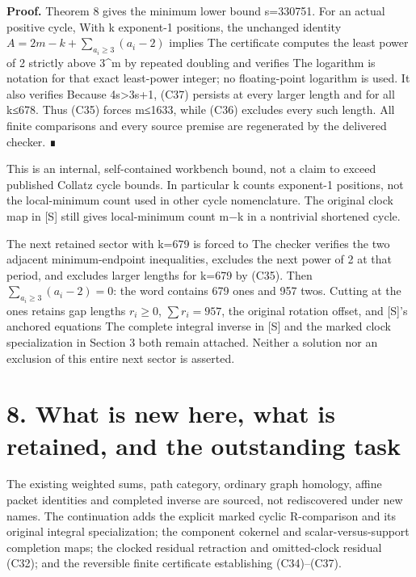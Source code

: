 \textbf{Proof.} Theorem 8 gives the minimum lower bound s=330751. For an
actual positive cycle,
 With k
exponent-1 positions, the unchanged identity
\(A=2m-k+\sum_{a_i\ge3}(a_i-2)\) implies
 The certificate computes the
least power of 2 strictly above 3\^{}m by repeated doubling and verifies
 The logarithm is notation for that exact
least-power integer; no floating-point logarithm is used. It also
verifies  Because
4s\textgreater3s+1, (C37) persists at every larger length and for all
k≤678. Thus (C35) forces m≤1633, while (C36) excludes every such length.
All finite comparisons and every source premise are regenerated by the
delivered checker. ∎

This is an internal, self-contained workbench bound, not a claim to
exceed published Collatz cycle bounds. In particular k counts exponent-1
positions, not the local-minimum count used in other cycle nomenclature.
The original clock map in {[}S{]} still gives local-minimum count m−k in
a nontrivial shortened cycle.

The next retained sector with k=679 is forced to
 The checker verifies the two adjacent
minimum-endpoint inequalities, excludes the next power of 2 at that
period, and excludes larger lengths for k=679 by (C35). Then
\(\sum_{a_i\ge3}(a_i-2)=0\): the word contains 679 ones and 957 twos.
Cutting at the ones retains gap lengths \(r_i\ge0\), \(\sum r_i=957\),
the original rotation offset, and {[}S{]}'s anchored equations
The complete integral inverse in {[}S{]} and the marked clock
specialization in Section 3 both remain attached. Neither a solution nor
an exclusion of this entire next sector is asserted.

\section{8. What is new here, what is retained, and the outstanding
task}

The existing weighted sums, path category, ordinary graph homology,
affine packet identities and completed inverse are sourced, not
rediscovered under new names. The continuation adds the explicit marked
cyclic R-comparison and its original integral specialization; the
component cokernel and scalar-versus-support completion maps; the
clocked residual retraction and omitted-clock residual (C32); and the
reversible finite certificate establishing (C34)--(C37).

